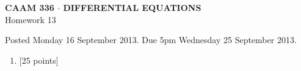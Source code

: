 \documentclass[10pt]{article}
\begin{document}
\vspace*{-5em}
\begin{center}
\large \textsf{\textbf{CAAM 336 $\cdot$ DIFFERENTIAL EQUATIONS}\\[0.5em]
Homework 13 }
\end{center}

Posted Monday 16 September 2013.  Due 5pm Wednesday 25 September 2013.

\begin{enumerate}\addtocounter{enumi}{12}
\item {[25 points]}\\  

\end{enumerate}
\end{document}
